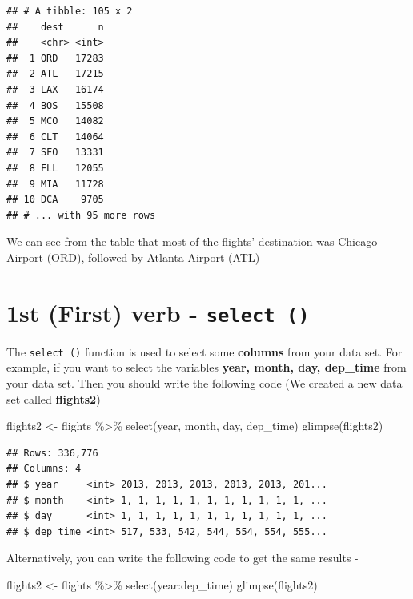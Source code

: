 \documentclass[
]{book}
\newenvironment{Shaded}{\begin{snugshade}}{\end{snugshade}}
\newcommand{\FunctionTok}[1]{\textcolor[rgb]{0.00,0.00,0.00}{#1}}
\newcommand{\NormalTok}[1]{#1}
\newcommand{\OtherTok}[1]{\textcolor[rgb]{0.56,0.35,0.01}{#1}}
\newcommand{\SpecialCharTok}[1]{\textcolor[rgb]{0.00,0.00,0.00}{#1}}
\begin{document}
\begin{verbatim}
## # A tibble: 105 x 2
##    dest      n
##    <chr> <int>
##  1 ORD   17283
##  2 ATL   17215
##  3 LAX   16174
##  4 BOS   15508
##  5 MCO   14082
##  6 CLT   14064
##  7 SFO   13331
##  8 FLL   12055
##  9 MIA   11728
## 10 DCA    9705
## # ... with 95 more rows
\end{verbatim}

We can see from the table that most of the flights' destination was Chicago Airport (ORD), followed by Atlanta Airport (ATL)

\hypertarget{st-first-verb---select}{%
\section{\texorpdfstring{1st (First) verb - \texttt{select\ ()}}{1st (First) verb - select ()}}\label{st-first-verb---select}}

The \texttt{select\ ()} function is used to select some \textbf{columns} from your data set. For example, if you want to select the variables \textbf{year, month, day, dep\_time} from your data set. Then you should write the following code (We created a new data set called \textbf{flights2})

\begin{Shaded}
\begin{Highlighting}[]
\NormalTok{flights2 }\OtherTok{\textless{}{-}}\NormalTok{ flights }\SpecialCharTok{\%\textgreater{}\%} 
  \FunctionTok{select}\NormalTok{(year, month, day, dep\_time)}
\FunctionTok{glimpse}\NormalTok{(flights2)}
\end{Highlighting}
\end{Shaded}

\begin{verbatim}
## Rows: 336,776
## Columns: 4
## $ year     <int> 2013, 2013, 2013, 2013, 2013, 201...
## $ month    <int> 1, 1, 1, 1, 1, 1, 1, 1, 1, 1, 1, ...
## $ day      <int> 1, 1, 1, 1, 1, 1, 1, 1, 1, 1, 1, ...
## $ dep_time <int> 517, 533, 542, 544, 554, 554, 555...
\end{verbatim}

Alternatively, you can write the following code to get the same results -

\begin{Shaded}
\begin{Highlighting}[]
\NormalTok{flights2 }\OtherTok{\textless{}{-}}\NormalTok{ flights }\SpecialCharTok{\%\textgreater{}\%} 
  \FunctionTok{select}\NormalTok{(year}\SpecialCharTok{:}\NormalTok{dep\_time)}
\FunctionTok{glimpse}\NormalTok{(flights2)}
\end{Highlighting}
\end{Shaded}
\end{document}
